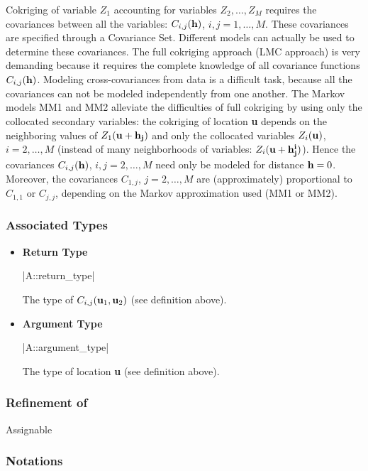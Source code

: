 \documentclass[12pt,twoside]{report}
\newcommand{\loc}[1]{{\bf #1}}
\newcommand{\mloc}[1]{\rm{\bf #1}}
\begin{document}
Cokriging of variable $Z_1$ accounting for variables $Z_2,\ldots, Z_M$ requires the covariances between all the variables: $C_{i,j}(\mloc{h})$, $i,j = 1, \ldots, M$. These covariances are specified through a Covariance Set. Different models can actually be used to determine these covariances. The full cokriging approach (LMC approach) is very demanding because it requires the complete knowledge of all covariance functions $C_{i,j}(\mloc{h})$. Modeling cross-covariances from data is a difficult task, because all the covariances can not be modeled independently from one another. The Markov models MM1 and MM2 alleviate the difficulties of full cokriging by using only the collocated secondary variables: the cokriging of location \loc{u} depends on the neighboring values of $Z_1(\mloc{u}+\mloc{h_j})$ and only the collocated variables $Z_i(\mloc{u})$, $i=2,\ldots,M$ (instead of many neighborhoods of variables: $Z_i(\mloc{u}+\mloc{h^i_j})$). Hence the covariances $C_{i,j}(\mloc{h})$, $i,j=2,\ldots,M$ need only be modeled for distance $\mloc{h}=0$. Moreover, the covariances $C_{1,j}$, $j=2,\ldots,M$ are (approximately) proportional to $C_{1,1}$ or $C_{j,j}$, depending on the Markov approximation used (MM1 or MM2). 



\htmlrule[CLEAR=all]  \subsubsection*{Associated Types}
\begin{itemize}
\item {\bf Return Type}

  |A::return_type|

  The type of $C_{i,j}(\mloc{u}_1, \mloc{u}_2)$ (see definition above).

\item {\bf Argument Type}

  |A::argument_type|

  The type of  location \loc{u} (see definition above).

\end{itemize}



\htmlrule[CLEAR=all]  \subsubsection*{Refinement of}
Assignable


 

\htmlrule[CLEAR=all]  \subsubsection*{Notations}
\end{document}

